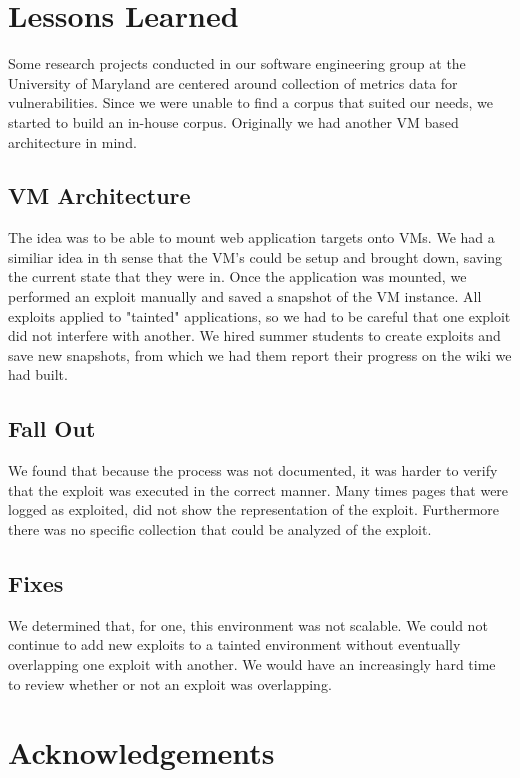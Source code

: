 \documentclass[letterpaper,twocolumn,10pt]{article}
\begin{document}
\section{Lessons Learned}

Some research projects conducted in our software engineering group at the University of Maryland are centered around collection of metrics data for vulnerabilities.  Since we were unable to find a corpus that suited our needs, we started to build an in-house corpus.  Originally we had another VM based architecture in mind.  

\subsection{VM Architecture}
The idea was to be able to mount web application targets onto VMs.  We had a similiar idea in th sense that the VM's could be setup and brought down, saving the current state that they were in.  Once the application was mounted, we performed an exploit manually and saved a snapshot of the VM instance.  All exploits applied to "tainted" applications, so we had to be careful that one exploit did not interfere with another.  We hired summer students to create exploits and save new snapshots, from which we had them report their progress on the wiki we had built.  

\subsection{Fall Out}
We found that because the process was not documented, it was harder to verify that the exploit was executed in the correct manner.  Many times pages that were logged as exploited, did not show the representation of the exploit.  Furthermore there was no specific collection that could be analyzed of the exploit.

\subsection{Fixes}
We determined that, for one, this environment was not scalable.  We could not continue to add new exploits to a tainted environment without eventually overlapping one exploit with another.  We would have an increasingly hard time to review whether or not an exploit was overlapping.

\section{Acknowledgements}
\end{document}
